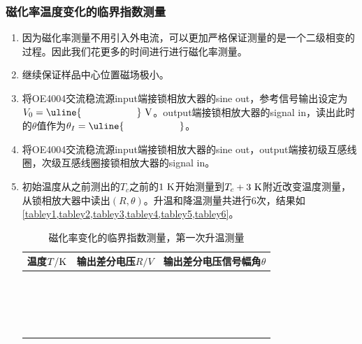\documentclass[11pt,a4paper]{ctexart}
\newcommand{\unit}[1]{\rm \ #1}
\begin{document}
\subsubsection{磁化率温度变化的临界指数测量}
  \begin{enumerate}
  \item
  因为磁化率测量不用引入外电流，可以更加严格保证测量的是一个二级相变的过程。因此我们花更多的时间进行进行磁化率测量。
  \item
  继续保证样品中心位置磁场极小。
  \item
   将OE4004交流稳流源input端接锁相放大器的sine out，参考信号输出设定为$V_0 = \uline{\hspace{20mm}}\unit{V}$。output端接锁相放大器的signal in，读出此时的$\theta$值作为$\theta_I = \uline{\hspace{20mm}}$。
  \item
  将OE4004交流稳流源input端接锁相放大器的sine out，output端接初级互感线圈，次级互感线圈接锁相放大器的signal in。
  \item
 初始温度从之前测出的$T_c$之前的$1\unit{K}$开始测量到$T_c + 3\unit{K}$附近改变温度测量，从锁相放大器中读出$(R,\theta)$。升温和降温测量共进行6次，结果如\cref{tabley1,tabley2,tabley3,tabley4,tabley5,tabley6}。
  \begin{table}[H]
\centering
\caption{磁化率变化的临界指数测量，第一次升温测量\label{tabley1}}
\begin{tabular}{|p{32mm}|p{32mm}|p{32mm}|}
\hline
温度$T/{\rm K}$ & 输出差分电压$R/{V}$ & 输出差分电压信号幅角$\theta$ \\ \hline
 & & \\ \hline
  & & \\ \hline
  & & \\ \hline
   & & \\ \hline
    & & \\ \hline
 & & \\ \hline
  &  &\\ \hline
  &  &\\ \hline
  &  &\\ \hline
  &  &\\ \hline
  &  &\\ \hline
  &  &\\ \hline
  &  &\\ \hline
  &  &\\ \hline
  &  &\\ \hline
  &  &\\ \hline
  &  &\\ \hline
  &  &\\ \hline

\end{tabular}
\end{table}
\end{enumerate}
\end{document}
